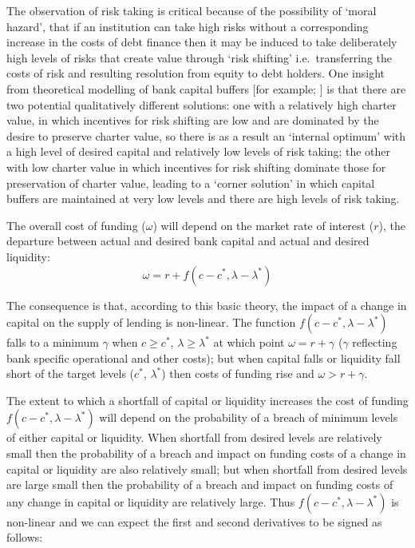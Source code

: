 \documentclass[
  12,
]{article}
\begin{document}
The observation of risk taking is critical because of the possibility of `moral hazard', that if an institution can take high risks without a corresponding increase in the costs of debt finance then it may be induced to take deliberately high levels of risks that create value through `risk shifting' i.e.~transferring the costs of risk and resulting resolution from equity to debt holders. One insight from theoretical modelling of bank capital buffers {[}for example; \citet{milne2002bank}{]} is that there are two potential qualitatively different solutions: one with a relatively high charter value, in which incentives for risk shifting are low and are dominated by the desire to preserve charter value, so there is as a result an `internal optimum' with a high level of desired capital and relatively low levels of risk taking; the other with low charter value in which incentives for risk shifting dominate those for preservation of charter value, leading to a `corner solution' in which capital buffers are maintained at very low levels and there are high levels of risk taking.

The overall cost of funding (\(\omega\)) will depend on the market rate of interest (\(r\)), the departure between actual and desired bank capital and actual and desired liquidity:
\[
\omega=r+f(c-c^\ast,\lambda-\lambda^\ast ) 
\]

The consequence is that, according to this basic theory, the impact of a change in capital on the supply of lending is non-linear. The function \(f(c-c^\ast,\lambda-\lambda^\ast )\) falls to a minimum \(\gamma\) when \(c \geq c^\ast\), \(\lambda\geq\lambda^\ast\) at which point \(\omega=r+ \gamma\) (\(\gamma\) reflecting bank specific operational and other costs); but when capital falls or liquidity fall short of the target levels (\(c^\ast\), \(\lambda^\ast\)) then costs of funding rise and \(\omega >r+ \gamma\).

The extent to which a shortfall of capital or liquidity increases the cost of funding \(f(c-c^\ast,\lambda-\lambda^\ast)\) will depend on the probability of a breach of minimum levels of either capital or liquidity. When shortfall from desired levels are relatively small then the probability of a breach and impact on funding costs of a change in capital or liquidity are also relatively small; but when shortfall from desired levels are large small then the probability of a breach and impact on funding costs of any change in capital or liquidity are relatively large. Thus \(f(c-c^\ast,\lambda-\lambda^\ast)\) is non-linear and we can expect the first and second derivatives to be signed as follows:
\end{document}
